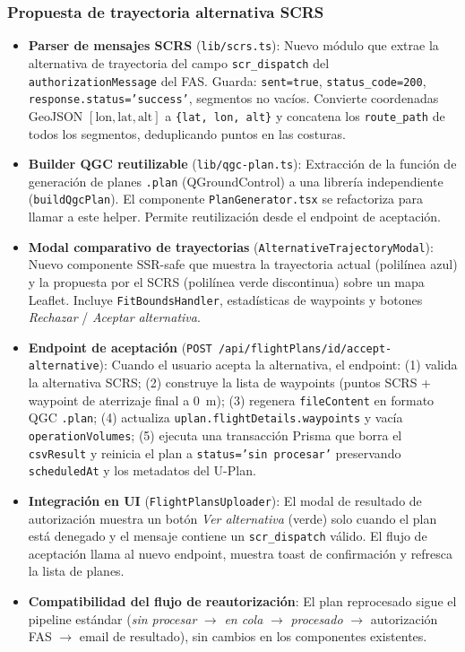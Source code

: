 \documentclass[12pt,a4paper]{article}
\begin{document}
\subsubsection*{Propuesta de trayectoria alternativa SCRS}
\begin{itemize}
    \item \textbf{Parser de mensajes SCRS} (\texttt{lib/scrs.ts}): Nuevo módulo que extrae la alternativa de trayectoria del campo \texttt{scr\_dispatch} del \texttt{authorizationMessage} del FAS. Guarda: \texttt{sent=true}, \texttt{status\_code=200}, \texttt{response.status='success'}, segmentos no vacíos. Convierte coordenadas GeoJSON $[\text{lon}, \text{lat}, \text{alt}]$ a \texttt{\{lat, lon, alt\}} y concatena los \texttt{route\_path} de todos los segmentos, deduplicando puntos en las costuras.
    \item \textbf{Builder QGC reutilizable} (\texttt{lib/qgc-plan.ts}): Extracción de la función de generación de planes \texttt{.plan} (QGroundControl) a una librería independiente (\texttt{buildQgcPlan}). El componente \texttt{PlanGenerator.tsx} se refactoriza para llamar a este helper. Permite reutilización desde el endpoint de aceptación.
    \item \textbf{Modal comparativo de trayectorias} (\texttt{AlternativeTrajectoryModal}): Nuevo componente SSR-safe que muestra la trayectoria actual (polilínea azul) y la propuesta por el SCRS (polilínea verde discontinua) sobre un mapa Leaflet. Incluye \texttt{FitBoundsHandler}, estadísticas de waypoints y botones \textit{Rechazar} / \textit{Aceptar alternativa}.
    \item \textbf{Endpoint de aceptación} (\texttt{POST /api/flightPlans/{id}/accept-alternative}): Cuando el usuario acepta la alternativa, el endpoint: (1) valida la alternativa SCRS; (2) construye la lista de waypoints (puntos SCRS + waypoint de aterrizaje final a 0~m); (3) regenera \texttt{fileContent} en formato QGC \texttt{.plan}; (4) actualiza \texttt{uplan.flightDetails.waypoints} y vacía \texttt{operationVolumes}; (5) ejecuta una transacción Prisma que borra el \texttt{csvResult} y reinicia el plan a \texttt{status='sin procesar'} preservando \texttt{scheduledAt} y los metadatos del U-Plan.
    \item \textbf{Integración en UI} (\texttt{FlightPlansUploader}): El modal de resultado de autorización muestra un botón \textit{Ver alternativa} (verde) solo cuando el plan está denegado y el mensaje contiene un \texttt{scr\_dispatch} válido. El flujo de aceptación llama al nuevo endpoint, muestra toast de confirmación y refresca la lista de planes.
    \item \textbf{Compatibilidad del flujo de reautorización}: El plan reprocesado sigue el pipeline estándar (\textit{sin procesar} $\rightarrow$ \textit{en cola} $\rightarrow$ \textit{procesado} $\rightarrow$ autorización FAS $\rightarrow$ email de resultado), sin cambios en los componentes existentes.
\end{itemize}
\end{document}
